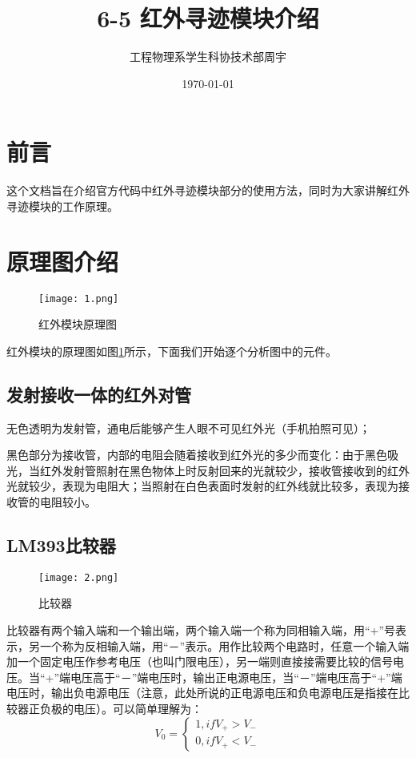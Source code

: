 

\graphicspath{{./img/ir/}{./img/}}




\title{6-5 红外寻迹模块介绍}
\author{工程物理系学生科协技术部\quad 周宇}
\date{\today}
\maketitle
\tableofcontents
\newpage


\section{前言}
这个文档旨在介绍官方代码中红外寻迹模块部分的使用方法，同时为大家讲解红外寻迹模块的工作原理。

\section{原理图介绍}
\begin{figure}[h]
\centering %
\texttt{[image: 1.png]}
\caption{红外模块原理图}
\label{红外模块原理图}
\end{figure}
红外模块的原理图如图\ref{红外模块原理图}所示，下面我们开始逐个分析图中的元件。

\subsection{发射接收一体的红外对管}
无色透明为发射管，通电后能够产生人眼不可见红外光（手机拍照可见）；

黑色部分为接收管，内部的电阻会随着接收到红外光的多少而变化：由于黑色吸光，当红外发射管照射在黑色物体上时反射回来的光就较少，接收管接收到的红外光就较少，表现为电阻大；当照射在白色表面时发射的红外线就比较多，表现为接收管的电阻较小。

\subsection{LM393比较器}
\begin{figure}[h]
\centering %
\texttt{[image: 2.png]}
\caption{比较器}
\label{比较器}
\end{figure}
比较器有两个输入端和一个输出端，两个输入端一个称为同相输入端，用“+”号表示，另一个称为反相输入端，用“－”表示。用作比较两个电路时，任意一个输入端加一个固定电压作参考电压（也叫门限电压），另一端则直接接需要比较的信号电压。当“+”端电压高于“－”端电压时，输出正电源电压，当“－”端电压高于“+”端电压时，输出负电源电压（注意，此处所说的正电源电压和负电源电压是指接在比较器正负极的电压）。可以简单理解为：
\[
V_0=
\begin{cases}
1,  if V_{+}>V_{-}\\
0,  if V_{+}<V_{-}
\end{cases}
\]

